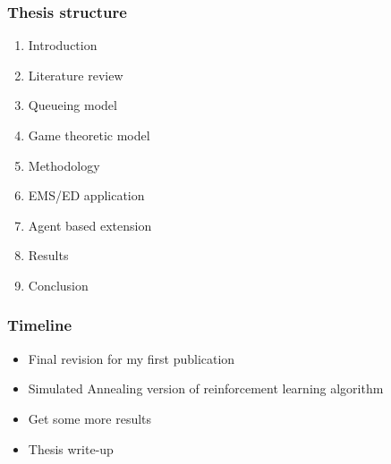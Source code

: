 \begin{frame}
    \frametitle{Thesis structure}

    \begin{enumerate}
        \item Introduction
        \item Literature review
        \item Queueing model
        \item Game theoretic model
        \item Methodology
        \item EMS/ED application
        \item Agent based extension
        \item Results
        \item Conclusion
    \end{enumerate}

\end{frame}


\begin{frame}
    \frametitle{Timeline}

    \begin{itemize}
        \item Final revision for my first publication
        \item Simulated Annealing version of reinforcement learning algorithm
        \item Get some more results
        \item Thesis write-up
    \end{itemize}

\end{frame}